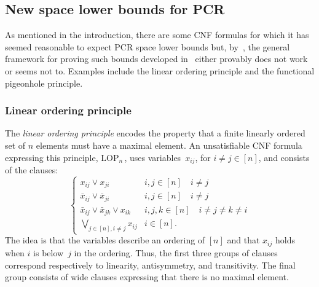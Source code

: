 \documentclass[11pt]{article}
\numberwithin{equation}{section}
\theoremstyle{definition}
\theoremstyle{plain}
\newcommand\LOP{\mathrm{LOP}}
\begin{document}
\subsection{New space lower bounds for PCR}


As mentioned in the introduction, there are some CNF formulas for which it has seemed reasonable to expect PCR space lower bounds but, by~\cite{DBLP:conf/icalp/FilmusLMNV13}, the general framework for proving such bounds developed in~\cite{DBLP:journals/jacm/BonacinaG15} either provably does not work or seems not to. Examples include the linear ordering principle and the functional pigeonhole principle.


\subsubsection{Linear ordering principle}
The \emph{linear ordering principle} encodes the property that a finite linearly ordered set of $n$ elements 
must have a maximal element.
An unsatisfiable CNF formula expressing this principle, $\LOP_n$\,, uses variables~$x_{ij}$,
for $i\not =j \in [n]$, and consists of the clauses: 
$$
\left \{
\begin{array}{ll}
 x_{ij} \vee  x_{ji} & i,j\in[n] \quad i \not =j \\
\bar x_{ij} \vee \bar x_{ji} & i,j\in[n] \quad i \not =j \\
\bar x_{ij} \vee \bar x_{jk} \vee x_{ik} &  i,j,k \in [n] \quad i\not = j\not = k \not = i \\
\bigvee_{j\in [n], i\not =j} x_{ij} & i \in [n].
\end{array}
\right.
$$
The idea is that the variables describe an ordering of $[n]$ and that $x_{ij}$ holds when $i$ is 
below~$j$ in the ordering.
Thus, the first three groups of clauses correspond respectively
to linearity, antisymmetry, and transitivity.
The final group consists of wide clauses expressing that there is no maximal element. 
\end{document}
